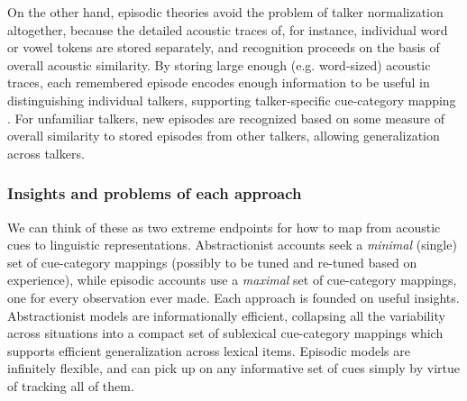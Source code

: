On the other hand, episodic theories avoid the problem of talker normalization altogether, because the detailed acoustic traces of, for instance, individual word or vowel tokens are stored separately, and recognition proceeds on the basis of overall acoustic similarity.  By storing large enough (e.g. word-sized) acoustic traces, each remembered episode encodes enough information to be useful in distinguishing individual talkers, supporting talker-specific cue-category mapping \autocite{Goldinger1998,Johnson1997a,Pierrehumbert2002}.  For unfamiliar talkers, new episodes are recognized based on some measure of overall similarity to stored episodes from other talkers, allowing generalization across talkers.  

\subsubsection{Insights and problems of each approach}
\label{sec:problems-with-each-approach}
\label{r3-granularity-of-mapping}

We can think of these as two extreme endpoints for how to map from acoustic cues to linguistic representations.  Abstractionist accounts seek a \emph{minimal} (single) set of cue-category mappings (possibly to be tuned and re-tuned based on experience), while episodic accounts use a \emph{maximal} set of cue-category mappings, one for every observation ever made.
Each approach is founded on useful insights. Abstractionist models are informationally efficient, collapsing all the variability across situations into a compact set of sublexical cue-category mappings which supports efficient generalization across lexical items.  Episodic models are infinitely flexible, and can pick up on any informative set of cues simply by virtue of tracking all of them. 

